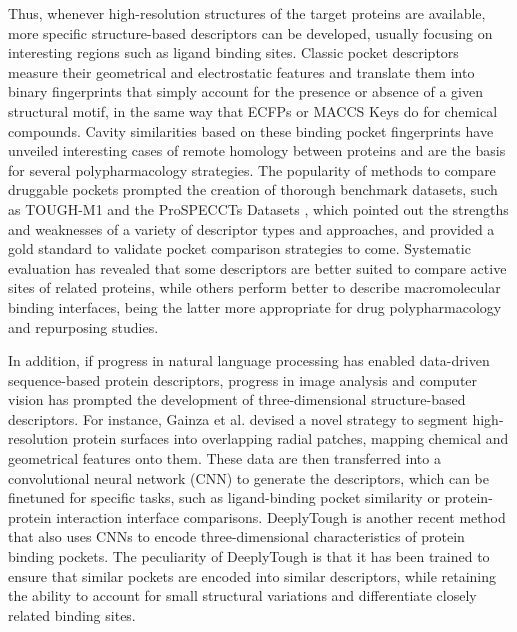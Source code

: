 Thus, whenever high-resolution structures of the target proteins are available, more specific structure-based descriptors can be developed, usually focusing on interesting regions such as ligand binding sites. Classic pocket descriptors measure their geometrical and electrostatic features and translate them into binary fingerprints that simply account for the presence or absence of a given structural motif, in the same way that ECFPs or MACCS Keys do for chemical compounds\cite{weill_alignment-free_2010, siragusa_biogps_2015, rogers_extended-connectivity_2010, durant_reoptimization_2002}. Cavity similarities based on these binding pocket fingerprints have unveiled interesting cases of remote homology between proteins \cite{stark_model_2003} and are the basis for several polypharmacology strategies\cite{duran-frigola_detecting_2017, chaudhari_up--date_2020}. The popularity of methods to compare druggable pockets prompted the creation of thorough benchmark datasets, such as TOUGH-M1\cite{govindaraj_comparative_2018} and the ProSPECCTs Datasets \cite{ehrt_benchmark_2018}, which pointed out the strengths and weaknesses of a variety of descriptor types and approaches, and provided a gold standard to validate pocket comparison strategies to come. Systematic evaluation has revealed that some descriptors are better suited to compare active sites of related proteins, while others perform better to describe macromolecular binding interfaces, being the latter more appropriate for drug polypharmacology and repurposing studies\cite{ehrt_binding_2019}.




In addition, if progress in natural language processing has enabled data-driven sequence-based protein descriptors, progress in image analysis and computer vision has prompted the development of three-dimensional structure-based descriptors. For instance, Gainza et al. \cite{gainza_deciphering_2020} devised a novel strategy to segment high-resolution protein surfaces into overlapping radial patches, mapping chemical and geometrical features onto them. These data are then transferred into a convolutional neural network (CNN) to generate the descriptors, which can be finetuned for specific tasks, such as ligand-binding pocket similarity or protein-protein interaction interface comparisons. DeeplyTough is another recent method that also uses CNNs to encode three-dimensional characteristics of protein binding pockets\cite{simonovsky_deeplytough_2020}. The peculiarity of DeeplyTough is that it has been trained to ensure that similar pockets are encoded into similar descriptors, while retaining the ability to account for small structural variations and differentiate closely related binding sites.

